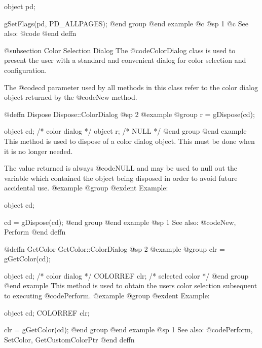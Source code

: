 object  pd;

gSetFlags(pd, PD_ALLPAGES);
@end group
@end example
@c @sp 1
@c See also:  @code{}
@end deffn














@subsection Color Selection Dialog
The @code{ColorDialog} class is used to present the user with a standard
and convenient dialog for color selection and configuration.

The @code{cd} parameter used by all methods in this class refer to
the color dialog object returned by the @code{New} method.









@deffn {Dispose} Dispose::ColorDialog
@sp 2
@example
@group
r = gDispose(cd);

object  cd;     /*  color dialog   */
object  r;      /*  NULL           */
@end group
@end example
This method is used to dispose of a color dialog object.  This must
be done when it is no longer needed.

The value returned is always @code{NULL} and may be used to null out
the variable which contained the object being disposed in order to
avoid future accidental use.
@example
@group
@exdent Example:

object  cd;

cd = gDispose(cd);
@end group
@end example
@sp 1
See also:  @code{New, Perform}
@end deffn









@deffn {GetColor} GetColor::ColorDialog
@sp 2
@example
@group
clr = gGetColor(cd);

object   cd;    /*  color dialog    */
COLORREF clr;   /*  selected color  */
@end group
@end example
This method is used to obtain the users color selection subsequent to
executing @code{Perform}.
@example
@group
@exdent Example:

object  cd;
COLORREF clr;

clr = gGetColor(cd);
@end group
@end example
@sp 1
See also:  @code{Perform, SetColor, GetCustomColorPtr}
@end deffn













